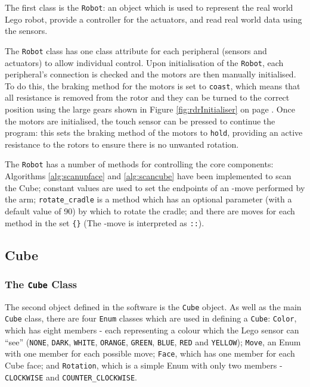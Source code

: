 \documentclass{report}
\newcommand{\moveset}[1]{\uppercase{\texttt{\{\formatmoves{#1}\}}}}
\newcommand{\movesequence}[1]{\uppercase{\texttt{:\formatmoves{#1}:}}}
\newcommand{\move}[1]{\uppercase{\texttt{\formatmovesnospace{#1}}}-move}
\begin{document}
    The first class is the \lstinline|Robot|: an object which is used to represent the real world Lego robot, provide a controller for the actuators, and read real world data using the sensors. 
    
    The \lstinline|Robot| class has one class attribute for each peripheral (sensors and actuators) to allow individual control. Upon initialisation of the \lstinline|Robot|, each peripheral's connection is checked and the motors are then manually initialised. To do this, the braking method for the motors is set to \lstinline|coast|, which means that all resistance is removed from the rotor and they can be turned to the correct position using the large gears shown in Figure \ref{fig:rdrInitialiser} on page \pageref{fig:rdrInitialiser}. Once the motors are initialised, the touch sensor can be pressed to continue the program: this sets the braking method of the motors to \lstinline|hold|, providing an active resistance to the rotors to ensure there is no unwanted rotation.
    
    The \lstinline|Robot| has a number of methods for controlling the core components: Algorithms \ref{alg:scanupface} and \ref{alg:scancube} have been implemented to scan the Cube; constant values are used to set the endpoints of an \move{x} performed by the arm; \lstinline|rotate_cradle| is a method which has an optional parameter (with a default value of 90) by which to rotate the cradle; and there are moves for each method in the set \moveset{x.x'x2y.y'y2d.d'd2} (The \move{x'} is interpreted as \movesequence{x.x.x}).
    
    \subsection{Cube}
    
    \subsubsection{The \lstinline|Cube| Class}
    
    The second object defined in the software is the \lstinline|Cube| object.  As well as the main \lstinline|Cube| class, there are four \lstinline|Enum| classes which are used in defining a \lstinline|Cube|: \lstinline|Color|, which has eight members - each representing a colour which the Lego sensor can \enquote{see} (\lstinline|NONE|, \lstinline|DARK|, \lstinline|WHITE|, \lstinline|ORANGE|, \lstinline|GREEN|, \lstinline|BLUE|, \lstinline|RED| and \lstinline|YELLOW|); \lstinline|Move|, an Enum with one member for each possible move; \lstinline|Face|, which has one member for each Cube face; and \lstinline|Rotation|, which is a simple Enum with only two members - \lstinline|CLOCKWISE| and \lstinline|COUNTER_CLOCKWISE|.
    
\end{document}
